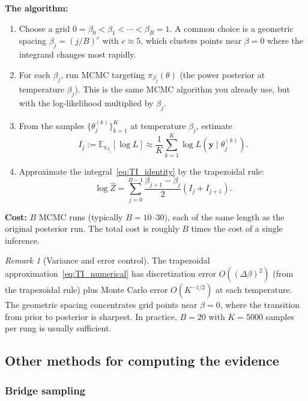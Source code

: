 \documentclass[11pt]{article}
\newcommand{\E}{\mathbb{E}}
\theoremstyle{plain}
\theoremstyle{remark}
\newtheorem{remark}{Remark}
\theoremstyle{definition}
\begin{document}
\noindent\textbf{The algorithm:}
\begin{enumerate}[label=\textbf{Step \arabic*.}]
\item Choose a grid $0 = \beta_0 < \beta_1 < \cdots < \beta_B = 1$. A 
  common choice is a geometric spacing $\beta_j = (j/B)^c$ with $c \approx 5$, 
  which clusters points near $\beta = 0$ where the integrand changes most 
  rapidly.
\item For each $\beta_j$, run MCMC targeting $\pi_{\beta_j}(\theta)$ (the 
  power posterior at temperature $\beta_j$). This is the same MCMC algorithm 
  you already use, but with the log-likelihood multiplied by $\beta_j$.
\item From the samples $\{\theta^{(k)}_j\}_{k=1}^K$ at temperature $\beta_j$, 
  estimate
  \[
  I_j := \E_{\pi_{\beta_j}}[\log L] \approx \frac{1}{K}\sum_{k=1}^K 
  \log L(\mathbf{y} \mid \theta^{(k)}_j).
  \]
\item Approximate the integral~\eqref{eq:TI_identity} by the trapezoidal rule:
  \begin{equation}\label{eq:TI_numerical}
  \log \hat{Z} = \sum_{j=0}^{B-1} \frac{\beta_{j+1} - \beta_j}{2}
  (I_j + I_{j+1}).
  \end{equation}
\end{enumerate}

\noindent\textbf{Cost:} $B$ MCMC runs (typically $B = 10$--$30$), each of 
the same length as the original posterior run. The total cost is roughly 
$B$ times the cost of a single inference.

\begin{remark}[Variance and error control]
The trapezoidal approximation~\eqref{eq:TI_numerical} has discretization 
error $O((\Delta\beta)^2)$ (from the trapezoidal rule) plus Monte Carlo 
error $O(K^{-1/2})$ at each temperature. The geometric spacing concentrates 
grid points near $\beta = 0$, where the transition from prior to posterior 
is sharpest. In practice, $B = 20$ with $K = 5000$ samples per rung is 
usually sufficient.
\end{remark}

\subsection{Other methods for computing the evidence}

\subsubsection{Bridge sampling}
\end{document}
